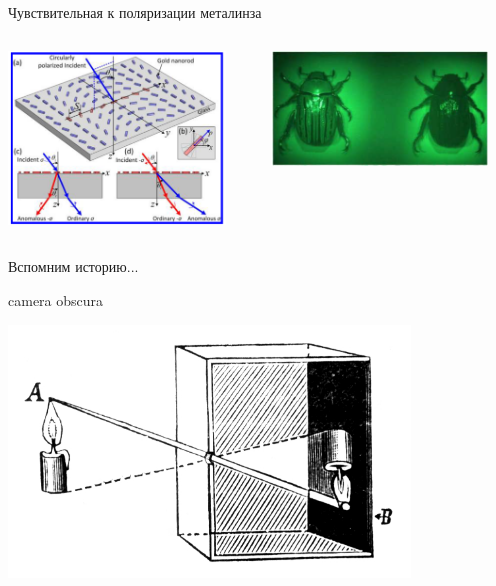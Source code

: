 \documentclass[9pt, compress, xcolor=table]{beamer}
\begin{document}
\begin{frame}{Чувствительная к поляризации металинза}
\begin{columns}[c]
\column{6.5cm}
\begin{center}
\includegraphics[width=0.9\textwidth]{nanopar1}
\end{center}
\column{6.5cm}
\begin{center}
\includegraphics[width=0.9\textwidth]{zhuk}
\end{center}
\end{columns}
\end{frame}


\begin{frame}{Вспомним историю...}

camera obscura

\begin{center}
\includegraphics[width=0.8\textwidth]{obscura}
\end{center}



\end{frame}
\end{document}

